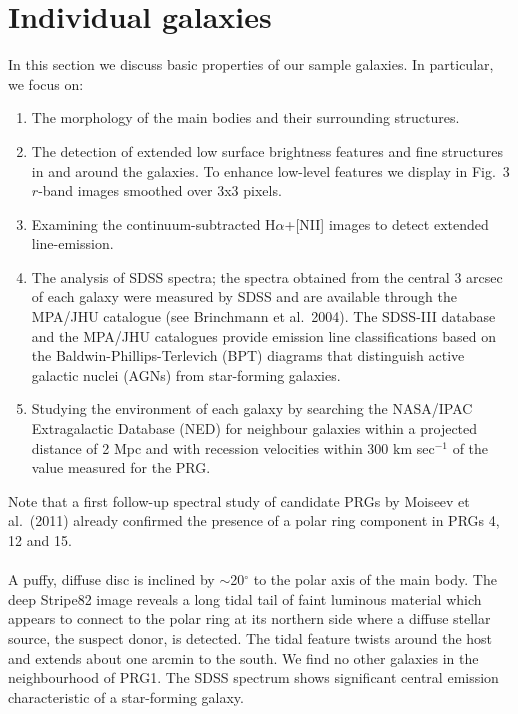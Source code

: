 \documentclass[useAMS,usenatbib]{mn2e}
\begin{document}
\section{Individual galaxies}
\label{S:analysis}
In this section we discuss basic properties of our sample galaxies.
In particular, we focus on:
\begin{enumerate}[1.]
 \item The morphology of the main bodies and their surrounding structures. 
 \item The detection of extended low surface brightness features and fine structures in and around the galaxies. 
To enhance low-level features we display in Fig.\ 3 $r$-band images smoothed over 3x3 pixels.
 \item Examining the continuum-subtracted H$\alpha$+[NII] images to detect extended line-emission. 
 \item The analysis of SDSS spectra; the spectra obtained from the central 3 arcsec of each galaxy were measured by SDSS and are available through the MPA/JHU catalogue (see Brinchmann et al.\ 2004). 
The SDSS-III database and the MPA/JHU catalogues provide emission line classifications based on the Baldwin-Phillips-Terlevich (BPT) diagrams that distinguish active galactic nuclei (AGNs) from star-forming galaxies. 
 \item Studying the environment of each galaxy by searching the NASA/IPAC Extragalactic Database (NED) for neighbour galaxies within a projected distance of 2 Mpc and with recession velocities within 300 km sec$^{-1}$ of the value measured for the PRG.
\end{enumerate}
Note that a first follow-up spectral study of candidate PRGs by Moiseev et al.\ (2011) already confirmed the presence of a polar ring component in PRGs 4, 12 and 15.  \\

 \\
A puffy, diffuse disc is inclined by $\sim$20$^\circ$ to the polar axis of the main body. The deep Stripe82 image reveals a long tidal tail of faint luminous material which appears to connect to the polar ring at its northern side where a diffuse stellar source, the suspect donor, is detected. The tidal feature twists around the host and extends about one arcmin to the south. 
We find no other galaxies in the neighbourhood of PRG1. The SDSS spectrum shows significant central emission characteristic of a star-forming galaxy.
\end{document}
